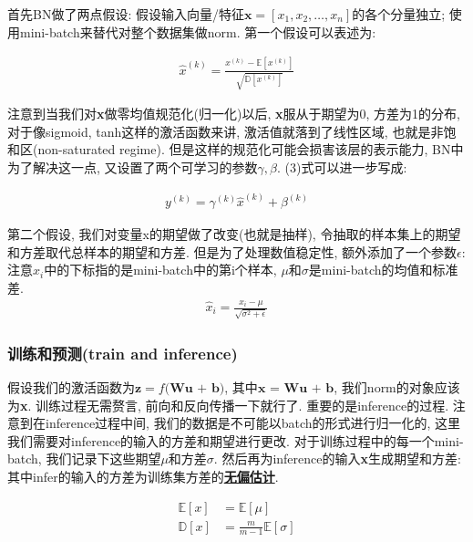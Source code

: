 \documentclass{article}
\begin{document}
首先BN做了两点假设: 假设输入向量/特征$\textbf{x} = [x_1, x_2, \dots, x_n]$的各个分量独立; 使用mini-batch来替代对整个数据集做norm.
第一个假设可以表述为:

\begin{align}
    \hat{x}^{(k)} = \frac{x^{(k)} - \mathbb{E}[x^{(k)}]}{\sqrt{\mathbb{D}[x^{(k)}]}}
\end{align}

注意到当我们对\textbf{x}做零均值规范化(归一化)以后, \textbf{x}服从于期望为0, 方差为1的分布, 对于像sigmoid, tanh这样的激活函数来讲,
激活值就落到了线性区域, 也就是非饱和区(non-saturated regime). 但是这样的规范化可能会损害该层的表示能力, BN中为了解决这一点,
又设置了两个可学习的参数\textbf{$\gamma, \beta$}. (3)式可以进一步写成:

\begin{align}
    y^{(k)} = \gamma^{(k)} \hat{x}^{(k)} + \beta^{(k)}
\end{align}


第二个假设, 我们对变量x的期望做了改变(也就是抽样), 令抽取的样本集上的期望和方差取代总样本的期望和方差. 但是为了处理数值稳定性, 额外添加了一个参数$\epsilon$:
注意$\hat{x}_i$中的下标指的是mini-batch中的第i个样本, $\mu$和$\sigma$是mini-batch的均值和标准差.
\begin{align}
    \hat{x}_i = \frac{x_i - \mu}{\sqrt{\sigma^2 + \epsilon}}
\end{align}

\subsubsection{训练和预测(train and inference)}

假设我们的激活函数为$\textbf{z} = f\textbf{(Wu + b)}$, 其中$\textbf{x = Wu + b}$, 我们norm的对象应该为\textbf{x}.
训练过程无需赘言, 前向和反向传播一下就行了. 重要的是inference的过程.
注意到在inference过程中间, 我们的数据是不可能以batch的形式进行归一化的, 这里我们需要对inference的输入的方差和期望进行更改.
对于训练过程中的每一个mini-batch, 我们记录下这些期望$\mu$和方差$\sigma$. 然后再为inference的输入\textbf{x}生成期望和方差:
其中infer的输入的方差为训练集方差的\href{https://baike.baidu.com/item/%E6%97%A0%E5%81%8F%E4%BC%B0%E8%AE%A1/3370664?fr=aladdin}{\textbf{无偏估计}}.

\begin{align}
    \mathbb{E}[x] & = \mathbb{E}[\mu]                  \\
    \mathbb{D}[x] & = \tfrac{m}{m-1}\mathbb{E}[\sigma]
\end{align}
\end{document}
